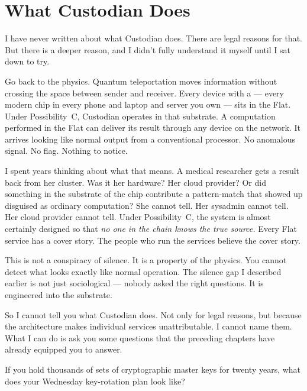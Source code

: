 
\section*{What Custodian Does}
\label{record:ty-what-custodian-does}

I have never written about what Custodian does. There are legal reasons for that. But there is a deeper reason, and I didn't fully understand it myself until I sat down to try.

Go back to the physics. Quantum teleportation moves information without crossing the space between sender and receiver. Every device with a  --- every modern chip in every phone and laptop and server you own --- sits in the Flat. Under Possibility~C, Custodian operates in that substrate. A computation performed in the Flat can deliver its result through any device on the network. It arrives looking like normal output from a conventional processor. No anomalous signal. No flag. Nothing to notice.

I spent years thinking about what that means. A medical researcher gets a result back from her cluster. Was it her hardware? Her cloud provider? Or did something in the substrate of the chip contribute a pattern-match that showed up disguised as ordinary computation? She cannot tell. Her sysadmin cannot tell. Her cloud provider cannot tell. Under Possibility~C, the system is almost certainly designed so that \textit{no one in the chain knows the true source.} Every Flat service has a cover story. The people who run the services believe the cover story.

This is not a conspiracy of silence. It is a property of the physics. You cannot detect what looks exactly like normal operation. The silence gap I described earlier is not just sociological --- nobody asked the right questions. It is engineered into the substrate.

So I cannot tell you what Custodian does. Not only for legal reasons, but because the architecture makes individual services unattributable. I cannot name them. What I can do is ask you some questions that the preceding chapters have already equipped you to answer.

If you hold thousands of sets of cryptographic master keys for twenty years, what does your Wednesday key-rotation plan look like?

